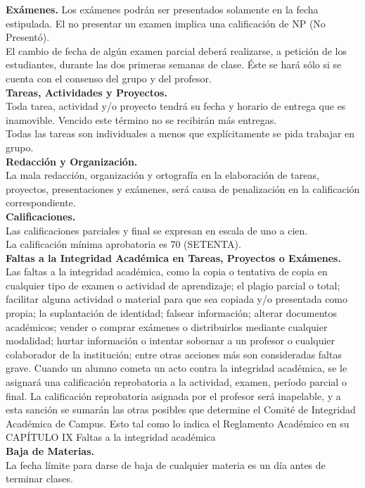 \documentclass[letterpaper, 10 pt, conference]{ieeeconf}  %
\begin{document}
\textbf{Exámenes.}
Los exámenes podrán ser presentados solamente en la fecha estipulada. El no presentar un examen implica una calificación de NP (No Presentó).\\
	El cambio de fecha de algún examen parcial deberá realizarse, a petición de los estudiantes, durante las dos primeras semanas de clase. Éste se hará sólo si se cuenta con el consenso del grupo y del profesor.\\
\textbf{Tareas, Actividades y Proyectos.}\\
	Toda tarea, actividad y/o proyecto tendrá su fecha y horario de entrega que es inamovible. Vencido este término no se recibirán más entregas.\\
	Todas las tareas son individuales a menos que explícitamente se pida trabajar en grupo.\\
\textbf{Redacción y Organización.}\\
	La mala redacción, organización y ortografía en la elaboración de tareas, proyectos, presentaciones y exámenes, será causa de penalización en la calificación correspondiente.\\
\textbf{Calificaciones.}\\
	Las calificaciones parciales y final se expresan en escala de uno a cien.\\
	La calificación mínima aprobatoria es 70 (SETENTA).\\
\textbf{Faltas a la Integridad Académica en Tareas, Proyectos o Exámenes.}\\
	Las faltas a la integridad académica, como la copia o tentativa de copia en cualquier tipo de examen o actividad de aprendizaje; el plagio parcial o total; facilitar alguna actividad o material para que sea copiada y/o presentada como propia; la suplantación de identidad; falsear información; alterar documentos académicos; vender o comprar exámenes o distribuirlos mediante cualquier modalidad; hurtar información o intentar sobornar a un profesor o cualquier colaborador de la institución; entre otras acciones más son consideradas faltas grave. Cuando un alumno cometa un acto contra la integridad académica, se le asignará una calificación reprobatoria a la actividad, examen, período parcial o final. La calificación reprobatoria asignada por el profesor será inapelable, y a esta sanción se sumarán las otras posibles que determine el Comité de Integridad Académica de Campus. Esto tal como lo indica el Reglamento Académico en su CAPÍTULO IX Faltas a la integridad académica \\
\textbf{Baja de Materias.}\\
	La fecha límite para darse de baja de cualquier materia es un día antes de terminar clases.\\
\end{document}
